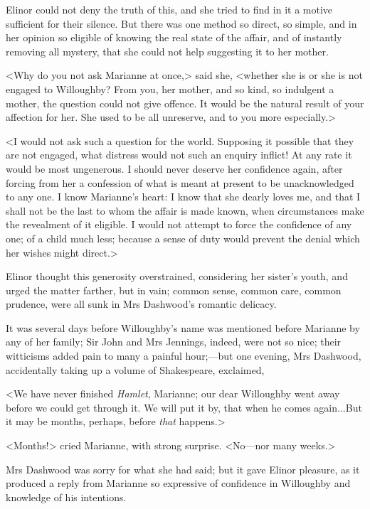 Elinor could not deny the truth of this, and she tried to find in it a motive sufficient for their silence. But there was one method so direct, so simple, and in her opinion so eligible of knowing the real state of the affair, and of instantly removing all mystery, that she could not help suggesting it to her mother.

<Why do you not ask Marianne at once,> said she, <whether she is or she is not engaged to Willoughby? From you, her mother, and so kind, so indulgent a mother, the question could not give offence. It would be the natural result of your affection for her. She used to be all unreserve, and to you more especially.>

<I would not ask such a question for the world. Supposing it possible that they are not engaged, what distress would not such an enquiry inflict! At any rate it would be most ungenerous. I should never deserve her confidence again, after forcing from her a confession of what is meant at present to be unacknowledged to any one. I know Marianne's heart: I know that she dearly loves me, and that I shall not be the last to whom the affair is made known, when circumstances make the revealment of it eligible. I would not attempt to force the confidence of any one; of a child much less; because a sense of duty would prevent the denial which her wishes might direct.>

Elinor thought this generosity overstrained, considering her sister's youth, and urged the matter farther, but in vain; common sense, common care, common prudence, were all sunk in Mrs Dashwood's romantic delicacy.

It was several days before Willoughby's name was mentioned before Marianne by any of her family; Sir John and Mrs Jennings, indeed, were not so nice; their witticisms added pain to many a painful hour;—but one evening, Mrs Dashwood, accidentally taking up a volume of Shakespeare, exclaimed,

<We have never finished \textit{Hamlet}, Marianne; our dear Willoughby went away before we could get through it. We will put it by, that when he comes again...But it may be months, perhaps, before \textit{that} happens.>

<Months!> cried Marianne, with strong surprise. <No—nor many weeks.>

Mrs Dashwood was sorry for what she had said; but it gave Elinor pleasure, as it produced a reply from Marianne so expressive of confidence in Willoughby and knowledge of his intentions.

